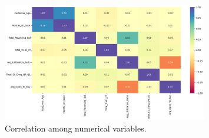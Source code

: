 \documentclass[10pt,a4paper]{style}
\begin{document}
	\begin{figure}[h]
		\centering
		\includegraphics[width=0.8\textwidth]{corr.png}
		\caption{Correlation among numerical variables.}
		\label{fig:corr}
	\end{figure}
	
	
\end{document}

